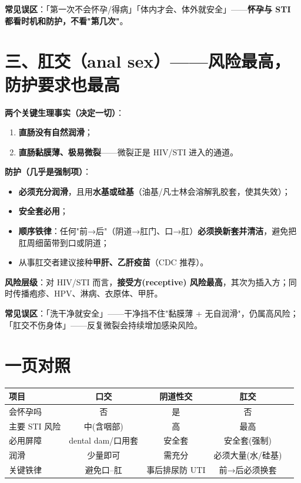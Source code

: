 \documentclass[12pt,UTF8,openany]{ctexbook}
\begin{document}
\textbf{常见误区}：「第一次不会怀孕/得病」「体内才会、体外就安全」——\textbf{怀孕与 STI 都看时机和防护，不看"第几次"}。

\section{三、肛交（anal sex）——风险最高，防护要求也最高}

\textbf{两个关键生理事实（决定一切）}：
\begin{enumerate}[leftmargin=2em,itemsep=0.3em]
  \item \textbf{直肠没有自然润滑}；
  \item \textbf{直肠黏膜薄、极易微裂}——微裂正是 HIV/STI 进入的通道。
\end{enumerate}

\textbf{防护（几乎是强制项）}：
\begin{itemize}[leftmargin=2em,itemsep=0.3em]
  \item \textbf{必须充分润滑}，且用\textbf{水基或硅基}（油基/凡士林会溶解乳胶套，使其失效）；
  \item \textbf{安全套必用}；
  \item \textbf{顺序铁律}：任何"前→后"（阴道→肛门、口→肛）\textbf{必须换新套并清洁}，避免把肛周细菌带到口或阴道；
  \item 从事肛交者建议接种\textbf{甲肝、乙肝疫苗}（CDC 推荐）。
\end{itemize}

\textbf{风险层级}：对 HIV/STI 而言，\textbf{接受方(receptive) 风险最高}，其次为插入方；同时传播疱疹、HPV、淋病、衣原体、甲肝。

\textbf{常见误区}：「洗干净就安全」——干净挡不住"黏膜薄 + 无自润滑"，仍属高风险；「肛交不伤身体」——反复微裂会持续增加感染风险。

\section{一页对照}

\begin{tabularx}{\textwidth}{lCCCC}
\toprule
项目 & 口交 & 阴道性交 & 肛交 \\
\midrule
会怀孕吗 & 否 & 是 & 否 \\
主要 STI 风险 & 中(含咽部) & 高 & 最高 \\
必用屏障 & dental dam/口用套 & 安全套 & 安全套(强制) \\
润滑 & 少量即可 & 需充分 & 必须大量(水/硅基) \\
关键铁律 & 避免口--肛 & 事后排尿防 UTI & 前→后必须换套 \\
\bottomrule
\end{tabularx}
\end{document}
